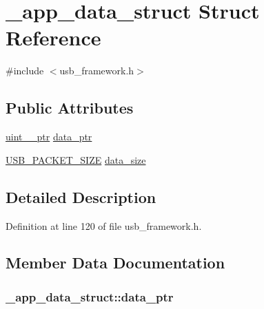 \hypertarget{struct__app__data__struct}{}\section{\+\_\+app\+\_\+data\+\_\+struct Struct Reference}
\label{struct__app__data__struct}


{\ttfamily \#include $<$usb\+\_\+framework.\+h$>$}

\subsection*{Public Attributes}
\begin{DoxyCompactItemize}
\item 
\hyperlink{types_8h_a7b968a76f3f622ee580e18acc3ab554c}{uint\+\_\+\_\+ptr} \hyperlink{struct__app__data__struct_a334a7f1693819b25f00614aab7c62e19}{data\+\_\+ptr}
\item 
\hyperlink{user__config_8h_a6e29b9c6856f378f54cd7f0a9a7ec910}{U\+S\+B\+\_\+\+P\+A\+C\+K\+E\+T\+\_\+\+S\+I\+ZE} \hyperlink{struct__app__data__struct_abc0190eb1ad295290935d9967e73c71f}{data\+\_\+size}
\end{DoxyCompactItemize}


\subsection{Detailed Description}


Definition at line 120 of file usb\+\_\+framework.\+h.



\subsection{Member Data Documentation}
\subsubsection[{\texorpdfstring{data\+\_\+ptr}{data_ptr}}]{ \+\_\+app\+\_\+data\+\_\+struct\+::data\+\_\+ptr}\hypertarget{struct__app__data__struct_a334a7f1693819b25f00614aab7c62e19}{}\label{struct__app__data__struct_a334a7f1693819b25f00614aab7c62e19}


